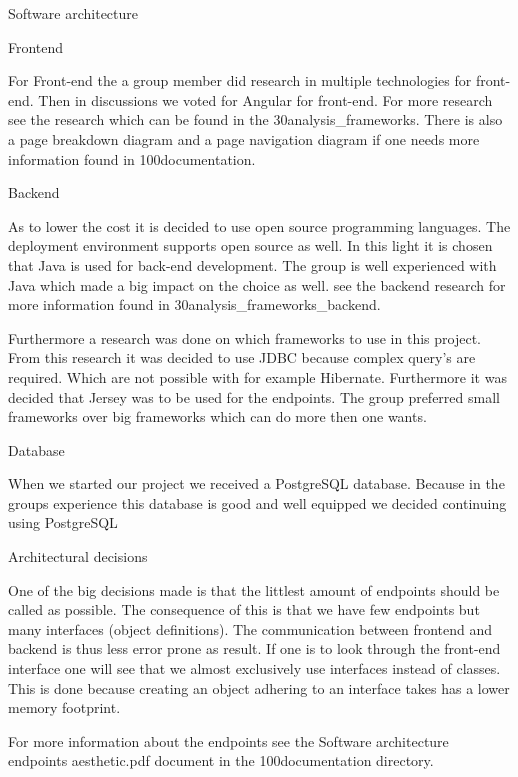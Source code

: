 Software architecture

Frontend

For Front-end the a group member did research in multiple technologies for front-end. Then in discussions we voted for Angular for front-end. For more research see the research which can be found in the 30analysis\frontend_frameworks. There is also a page breakdown diagram and a page navigation diagram if one needs more information found in 100documentation\frontend.

Backend

As to lower the cost it is decided to use open source programming languages. The deployment environment supports open source as well. In this light it is chosen that Java is used for back-end development. The group is well experienced with Java which made a big impact on the choice as well. see the backend research for more information found in 30analysis\java_frameworks_backend.

Furthermore a research was done on which frameworks to use in this project. From this research it was decided to use JDBC because complex query's are required. Which are not possible with for example Hibernate. Furthermore it was decided that Jersey was to be used for the endpoints. The group preferred small frameworks over big frameworks which can do more then one wants.

Database

When we started our project we received a PostgreSQL database. Because in the groups experience this database is good and well equipped we decided continuing using PostgreSQL

Architectural decisions

One of the big decisions made is that the littlest amount of endpoints should be called as possible. The consequence of this is that we have few endpoints but many interfaces (object definitions). The communication between frontend and backend is thus less error prone as result. If one is to look through the front-end interface one will see that we almost exclusively use interfaces instead of classes. This is done because creating an object adhering to an interface takes has a lower memory footprint.

For more information about the endpoints see the Software architecture endpoints aesthetic.pdf document in the 100documentation directory.



